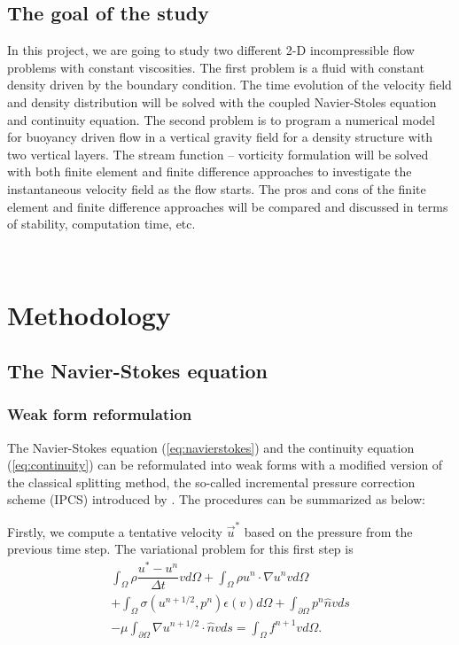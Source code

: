 \documentclass[11pt]{article}
\numberwithin{figure}{section}  %
\numberwithin{equation}{section}  %
\begin{document}
\begin{multicols}{2}
\subsection{The goal of the study}

In this project, we are going to study two different 2-D incompressible flow problems with constant viscosities. The first problem is a fluid with constant density driven by the boundary condition. The time evolution of the velocity field and density distribution will be solved with the coupled Navier-Stoles equation and continuity equation. The second problem is to program a numerical model for buoyancy driven flow in a vertical gravity field for a density structure with two vertical layers. The stream function – vorticity formulation will be solved with both finite element and finite difference approaches to investigate the instantaneous velocity field as the flow starts. The pros and cons of the finite element and finite difference approaches will be compared and discussed in terms of stability, computation time, etc.

~\\

\section{Methodology}

\subsection{The Navier-Stokes equation}

\subsubsection{Weak form reformulation}

The Navier-Stokes equation (\ref{eq:navierstokes}) and the continuity equation (\ref{eq:continuity}) can be reformulated into weak forms with a modified version of the classical splitting method, the so-called incremental pressure correction scheme (IPCS) introduced by \citet{goda1979multistep}. The procedures can be summarized as below:

Firstly, we compute a tentative velocity $\vec{u}^*$ based on the pressure from the previous time step. The variational problem for this first step is
\begin{multline}\label{eq:stepone}
	\int_\Omega\rho\dfrac{u^*-u^n}{\Delta{t}}vd\Omega + \int_\Omega\rho{u}^n\cdot\nabla{u}^nvd\Omega \\
	+ \int_\Omega\sigma(u^{n+1/2},p^n)\epsilon(v)d\Omega + \int_{\partial\Omega}p^n\hat{n}vds \\
	- \mu\int_{\partial\Omega}\nabla{u}^{n+1/2}\cdot\hat{n}vds = \int_\Omega{f}^{n+1}vd\Omega.
\end{multline}


\end{multicols}
\end{document}
